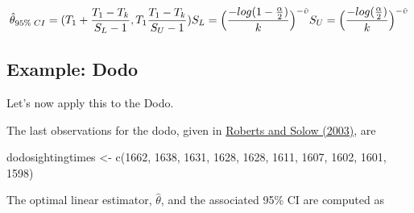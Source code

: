 \documentclass[
]{article}
\newenvironment{Shaded}{\begin{snugshade}}{\end{snugshade}}
\newcommand{\DecValTok}[1]{\textcolor[rgb]{0.00,0.00,0.81}{#1}}
\newcommand{\FunctionTok}[1]{\textcolor[rgb]{0.00,0.00,0.00}{#1}}
\newcommand{\NormalTok}[1]{#1}
\newcommand{\OtherTok}[1]{\textcolor[rgb]{0.56,0.35,0.01}{#1}}
\begin{document}
\[
\hat\theta_{95\% \;CI}= (T_1 + \frac{T_1 - T_k}{S_L - 1},T_1 \frac{T_1 - T_k}{S_U - 1})
\\
S_L = \Big(\frac{-log ( 1-\frac{\alpha}{2}) }{k}\Big)^{-\hat\upsilon} 
\\
S_U = \Big(\frac{-log (\frac{\alpha}{2}) }{k}\Big)^{-\hat\upsilon}
\]

\hypertarget{example-dodo}{%
\subsection{Example: Dodo}\label{example-dodo}}

Let's now apply this to the Dodo.

The last observations for the dodo, given in
\href{https://www.nature.com/articles/426245a}{Roberts and Solow
(2003)}, are

\begin{Shaded}
\begin{Highlighting}[]
\NormalTok{dodosightingtimes }\OtherTok{\textless{}{-}} \FunctionTok{c}\NormalTok{(}\DecValTok{1662}\NormalTok{, }\DecValTok{1638}\NormalTok{, }\DecValTok{1631}\NormalTok{, }\DecValTok{1628}\NormalTok{, }\DecValTok{1628}\NormalTok{, }\DecValTok{1611}\NormalTok{, }\DecValTok{1607}\NormalTok{, }\DecValTok{1602}\NormalTok{, }\DecValTok{1601}\NormalTok{, }\DecValTok{1598}\NormalTok{)}
\end{Highlighting}
\end{Shaded}

The optimal linear estimator, \(\hat\theta\), and the associated 95\% CI
are computed as
\end{document}
